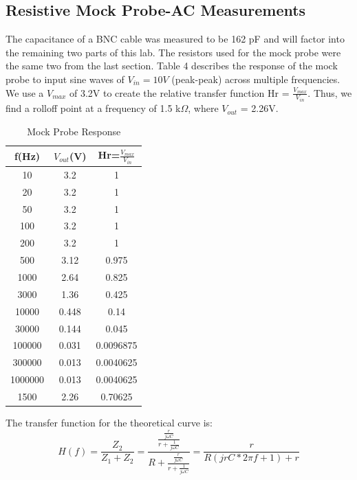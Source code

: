 \documentclass{article}
\begin{document}
\subsection{Resistive Mock Probe-AC Measurements}
    The capacitance of a BNC cable was measured to be 162 pF and will factor into the remaining two parts of this lab. The resistors used for the mock probe were the same two from the last section. Table 4 describes the response of the mock probe to input sine waves of $V_{in} = 10V$ (peak-peak) across multiple frequencies. We use a $V_{max}$ of 3.2V to create the relative transfer function Hr = $\frac{V_{max}}{V_{in}}$. Thus, we find a rolloff point at a frequency of 1.5 k$\Omega$, where $V_{out}$ = 2.26V. 
    \begin{table}[h]
    \centering
    \caption{Mock Probe Response}
    \label{my-label}
    \begin{tabular}{ccc}
    \textbf{f(Hz)} & \textbf{$V_{out}$(V)} & \textbf{Hr=$\frac{V_{max}}{V_{in}}$} \\ \hline
    10 & 3.2 & 1 \\
    20 & 3.2 & 1 \\
    50 & 3.2 & 1 \\
    100 & 3.2 & 1 \\
    200 & 3.2 & 1 \\
    500 & 3.12 & 0.975 \\
    1000 & 2.64 & 0.825 \\
    3000 & 1.36 & 0.425 \\
    10000 & 0.448 & 0.14 \\
    30000 & 0.144 & 0.045 \\
    100000 & 0.031 & 0.0096875 \\
    300000 & 0.013 & 0.0040625 \\
    1000000 & 0.013 & 0.0040625 \\
    1500 & 2.26 & 0.70625
    \end{tabular}
    \end{table}
    The transfer function for the theoretical curve is:
    \begin{equation}
       H(f) = \frac{Z_2}{Z_1 + Z_2} = \frac{\frac{\frac{r}{j\omega C}}{r + \frac{1}{j\omega C}}}{R + \frac{\frac{r}{j\omega C}}{r + \frac{1}{j\omega C}}} = \frac{r}{R(jrC*2\pi f + 1) + r}
    \end{equation}
\end{document}
